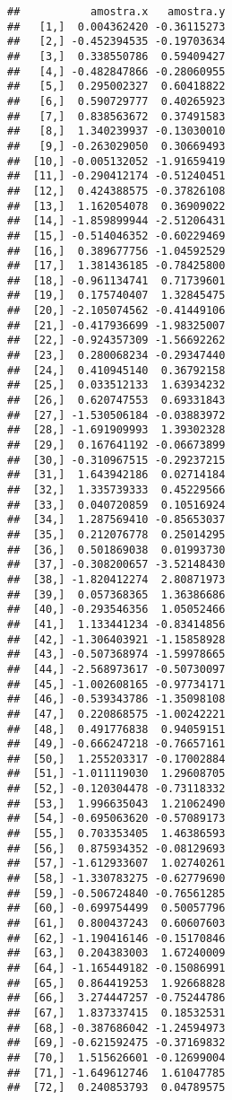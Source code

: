 \documentclass[]{book}
\begin{document}
\begin{verbatim}
##           amostra.x   amostra.y
##   [1,]  0.004362420 -0.36115273
##   [2,] -0.452394535 -0.19703634
##   [3,]  0.338550786  0.59409427
##   [4,] -0.482847866 -0.28060955
##   [5,]  0.295002327  0.60418822
##   [6,]  0.590729777  0.40265923
##   [7,]  0.838563672  0.37491583
##   [8,]  1.340239937 -0.13030010
##   [9,] -0.263029050  0.30669493
##  [10,] -0.005132052 -1.91659419
##  [11,] -0.290412174 -0.51240451
##  [12,]  0.424388575 -0.37826108
##  [13,]  1.162054078  0.36909022
##  [14,] -1.859899944 -2.51206431
##  [15,] -0.514046352 -0.60229469
##  [16,]  0.389677756 -1.04592529
##  [17,]  1.381436185 -0.78425800
##  [18,] -0.961134741  0.71739601
##  [19,]  0.175740407  1.32845475
##  [20,] -2.105074562 -0.41449106
##  [21,] -0.417936699 -1.98325007
##  [22,] -0.924357309 -1.56692262
##  [23,]  0.280068234 -0.29347440
##  [24,]  0.410945140  0.36792158
##  [25,]  0.033512133  1.63934232
##  [26,]  0.620747553  0.69331843
##  [27,] -1.530506184 -0.03883972
##  [28,] -1.691909993  1.39302328
##  [29,]  0.167641192 -0.06673899
##  [30,] -0.310967515 -0.29237215
##  [31,]  1.643942186  0.02714184
##  [32,]  1.335739333  0.45229566
##  [33,]  0.040720859  0.10516924
##  [34,]  1.287569410 -0.85653037
##  [35,]  0.212076778  0.25014295
##  [36,]  0.501869038  0.01993730
##  [37,] -0.308200657 -3.52148430
##  [38,] -1.820412274  2.80871973
##  [39,]  0.057368365  1.36386686
##  [40,] -0.293546356  1.05052466
##  [41,]  1.133441234 -0.83414856
##  [42,] -1.306403921 -1.15858928
##  [43,] -0.507368974 -1.59978665
##  [44,] -2.568973617 -0.50730097
##  [45,] -1.002608165 -0.97734171
##  [46,] -0.539343786 -1.35098108
##  [47,]  0.220868575 -1.00242221
##  [48,]  0.491776838  0.94059151
##  [49,] -0.666247218 -0.76657161
##  [50,]  1.255203317 -0.17002884
##  [51,] -1.011119030  1.29608705
##  [52,] -0.120304478 -0.73118332
##  [53,]  1.996635043  1.21062490
##  [54,] -0.695063620 -0.57089173
##  [55,]  0.703353405  1.46386593
##  [56,]  0.875934352 -0.08129693
##  [57,] -1.612933607  1.02740261
##  [58,] -1.330783275 -0.62779690
##  [59,] -0.506724840 -0.76561285
##  [60,] -0.699754499  0.50057796
##  [61,]  0.800437243  0.60607603
##  [62,] -1.190416146 -0.15170846
##  [63,]  0.204383003  1.67240009
##  [64,] -1.165449182 -0.15086991
##  [65,]  0.864419253  1.92668828
##  [66,]  3.274447257 -0.75244786
##  [67,]  1.837337415  0.18532531
##  [68,] -0.387686042 -1.24594973
##  [69,] -0.621592475 -0.37169832
##  [70,]  1.515626601 -0.12699004
##  [71,] -1.649612746  1.61047785
##  [72,]  0.240853793  0.04789575

\end{verbatim}
\end{document}
